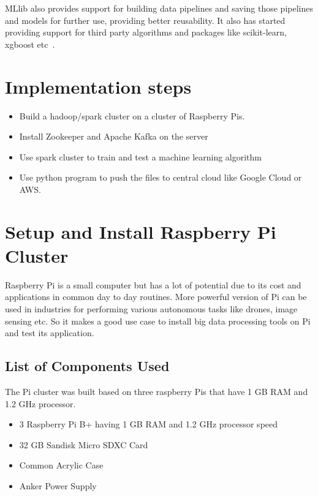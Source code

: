 MLlib also provides support for building data pipelines and saving
those pipelines and models for further use, providing better
reusability. It also has started providing support for third party
algorithms and packages like scikit-learn, xgboost
etc~\cite{hid-sp18-510-mllib2}.

\section{Implementation steps}


\begin{itemize}
	\item Build a hadoop/spark cluster on a cluster of Raspberry Pis.
	\item Install Zookeeper and Apache Kafka on the server
	\item Use spark cluster to train and test a machine learning algorithm
	\item Use python program to push the files to central cloud like
    Google Cloud or AWS.
\end{itemize} 

\section{Setup and Install Raspberry Pi Cluster}

Raspberry Pi is a small computer but has a lot of potential due to its
cost and applications in common day to day routines. More powerful
version of Pi can be used in industries for performing various
autonomous tasks like drones, image sensing etc. So it makes a good
use case to install big data processing tools on Pi and test its
application.

\subsection{List of Components Used}

The Pi cluster was built based on three raspberry Pis that have 1 GB
RAM and 1.2 GHz processor.

\begin{itemize}
	\item 3 Raspberry Pi B+ having 1 GB RAM and 1.2 GHz processor speed
	\item 32 GB Sandisk Micro SDXC Card
	\item Common Acrylic Case
	\item Anker Power Supply
\end{itemize}

